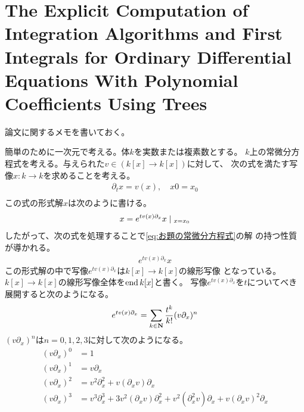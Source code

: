 \section{The Explicit Computation of Integration Algorithms and First Integrals for Ordinary Differential Equations With Polynomial Coefficients Using Trees}\label{s1:The Explicit Computation of Integration Algorithms and First Integrals for Ordinary Differential Equations With Polynomial Coefficients Using Trees} %
	論文\cite{url:grossman:explicit}に関するメモを書いておく。

	簡単のために一次元で考える。体$k$を実数または複素数とする。
	$k$上の常微分方程式を考える。与えられた$v\in(k[x]\to k[x])$に対して、
	次の式を満たす写像$x:k\to k$を求めることを考える。
	\begin{equation}\label{eq:お題の常微分方程式}\begin{split} %
		\partial_tx = v(x),\quad x0=x_0 \\
	\end{split}\end{equation} %
	この式の形式解$x$は次のように書ける。
	\begin{equation}\begin{split} %
		x = e^{tv(x)\partial_x}x\bou_{x=x_0}
	\end{split}\end{equation} %
	したがって、次の式を処理することで\eqref{eq:お題の常微分方程式}の解
	の持つ性質が導かれる。
	\begin{equation}\label{eq:常微分方程式の形式解}\begin{split} %
		e^{tv(x)\partial_x}x
	\end{split}\end{equation} %
	この形式解の中で写像$e^{tv(x)\partial_x}$は$k[x]\to k[x]$の線形写像
	となっている。$k[x]\to k[x]$の線形写像全体を$\operatorname{end}k[x]$と書く。
	写像$e^{tv(x)\partial_x}$を$t$についてべき展開すると次のようになる。
	\begin{equation}\begin{split} %
		e^{tv(x)\partial_x} &= \sum_{k\in\mybf{N}}\frac{t^k}{k!}(v\partial_x)^n \\
	\end{split}\end{equation} %
	$(v\partial_x)^n$は$n=0,1,2,3$に対して次のようになる。
	\begin{equation}\begin{split} %
		(v\partial_x)^0 &= 1 \\
		(v\partial_x)^1 &= v\partial_x \\
		(v\partial_x)^2 &= v^2\partial_x^2 + v(\partial_xv)\partial_x \\
		(v\partial_x)^3 &= v^3\partial_x^3 + 3v^2(\partial_xv)\partial_x^2 
			+ v^2(\partial_x^2v)\partial_x + v(\partial_xv)^2\partial_x \\
	\end{split}\end{equation} %
